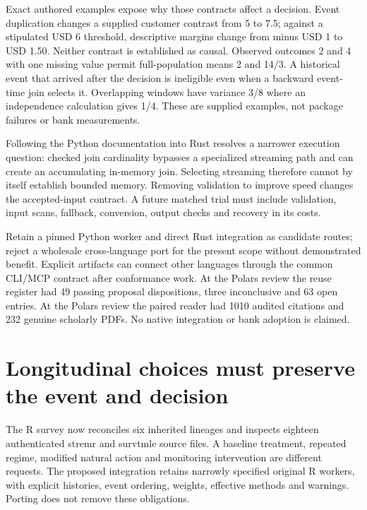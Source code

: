 Exact authored examples expose why those contracts affect a decision.
Event duplication changes a supplied customer contrast from 5 to 7.5;
against a stipulated USD 6 threshold, descriptive margins change from
minus USD 1 to USD 1.50. Neither contrast is established as causal.
Observed outcomes 2 and 4 with one missing value permit full-population
means 2 and 14/3. A historical event that arrived after the decision is
ineligible even when a backward event-time join selects it. Overlapping
windows have variance 3/8 where an independence calculation gives 1/4.
These are supplied examples, not package failures or bank measurements.
\citep{exec23_polars_reference}

Following the Python documentation into Rust resolves a narrower
execution question: checked join cardinality bypasses a specialized
streaming path and can create an accumulating in-memory join. Selecting
streaming therefore cannot by itself establish bounded memory. Removing
validation to improve speed changes the accepted-input contract. A
future matched trial must include validation, input scans, fallback,
conversion, output checks and recovery in its costs.
\citep{exec23_polars_sources}

Retain a pinned Python worker and direct Rust integration as candidate
routes; reject a wholesale cross-language port for the present scope
without demonstrated benefit. Explicit artifacts can connect other
languages through the common CLI/MCP contract after conformance work. At
the Polars review the reuse register had 49 passing proposal
dispositions, three inconclusive and 63 open entries. At the Polars
review the paired reader had 1010 audited citations and 232 genuine
scholarly PDFs. No native integration or bank adoption is claimed.
\citep{sp23polars_reader,sp23polars_progress}

\hypertarget{longitudinal-choices-must-preserve-the-event-and-decision}{%
\section{Longitudinal choices must preserve the event and
decision}\label{longitudinal-choices-must-preserve-the-event-and-decision}}

The R survey now reconciles six inherited lineages and inspects eighteen
authenticated stremr and survtmle source files. A baseline treatment,
repeated regime, modified natural action and monitoring intervention are
different requests. The proposed integration retains narrowly specified
original R workers, with explicit histories, event ordering, weights,
effective methods and warnings. Porting does not remove these
obligations. \citep{exec23_longr_stremr,exec23_longr_survtmle}

